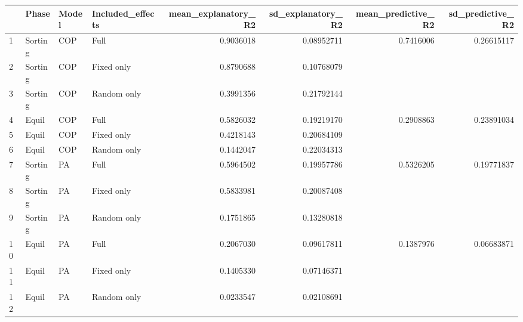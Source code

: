 \begin{table}[ht]
\centering
\begin{tabular}{llllrrrr}
  \hline
 & Phase & Model & Included\_effects & mean\_explanatory\_R2 & sd\_explanatory\_R2 & mean\_predictive\_R2 & sd\_predictive\_R2 \\ 
  \hline
1 & Sorting & COP & Full & 0.9036018 & 0.08952711 & 0.7416006 & 0.26615117 \\ 
  2 & Sorting & COP & Fixed only & 0.8790688 & 0.10768079 &  &  \\ 
  3 & Sorting & COP & Random only & 0.3991356 & 0.21792144 &  &  \\ 
  4 & Equil & COP & Full & 0.5826032 & 0.19219170 & 0.2908863 & 0.23891034 \\ 
  5 & Equil & COP & Fixed only & 0.4218143 & 0.20684109 &  &  \\ 
  6 & Equil & COP & Random only & 0.1442047 & 0.22034313 &  &  \\ 
  7 & Sorting & PA & Full & 0.5964502 & 0.19957786 & 0.5326205 & 0.19771837 \\ 
  8 & Sorting & PA & Fixed only & 0.5833981 & 0.20087408 &  &  \\ 
  9 & Sorting & PA & Random only & 0.1751865 & 0.13280818 &  &  \\ 
  10 & Equil & PA & Full & 0.2067030 & 0.09617811 & 0.1387976 & 0.06683871 \\ 
  11 & Equil & PA & Fixed only & 0.1405330 & 0.07146371 &  &  \\ 
  12 & Equil & PA & Random only & 0.0233547 & 0.02108691 &  &  \\ 
   \hline
\end{tabular}
\end{table}

